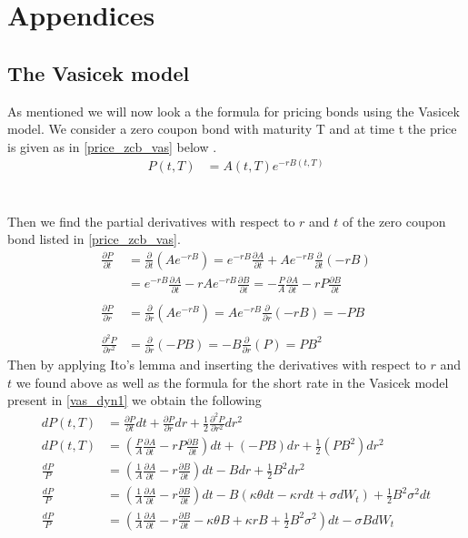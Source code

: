 \section{Appendices}
\subsection*{The Vasicek model}\label{appendices}
   
 As mentioned we will now look a the formula for pricing bonds using the Vasicek model. We consider a zero coupon bond
 with maturity T and at time t the price is given as in \autoref{price_zcb_vas} below \cite{Bjork}.
 \begin{align}
     P(t,T) &= A(t,T) e^{-rB(t,T)} 
     \label{price_zcb_vas} 
 \end{align}
 \\\\
 Then we find the partial derivatives with respect to $r$ and $t$ of the zero coupon bond listed in \autoref{price_zcb_vas}.
 \begin{align*}
     \frac{\partial P}{\partial t} &= \frac{\partial}{\partial t} (Ae^{-rB}) 
     = e^{-rB} \frac{\partial A}{\partial t} + Ae^{-rB} \frac{\partial}{\partial t} (-rB) \\
     &= e^{-rB} \frac{\partial A}{\partial t} - rAe^{-rB} \frac{\partial B}{\partial t} = 
     - \frac{P}{A} \frac{\partial A}{\partial t} - rP \frac{\partial B}{\partial t}
     \\\\
     \frac{\partial P}{\partial r} &= \frac{\partial}{\partial r} (Ae^{-rB}) 
     = Ae^{-rB} \frac{\partial}{\partial r} (-rB) = -PB 
     \\\\
     \frac{\partial^2 P}{\partial r^2} &= \frac{\partial}{\partial r} (-PB) = -B \frac{\partial}{\partial r} (P) = PB^2
 \end{align*}
 Then by applying Ito's lemma \cite{Bjork} and inserting the derivatives with respect to $r$ and $t$ we found above as well as
  the formula for the short rate in the Vasicek model present in \autoref{vas_dyn1} we obtain the following
 \begin{align*}
     dP(t,T) &= \frac{\partial P}{\partial t} dt + \frac{\partial P}{\partial r} dr 
     + \frac{1}{2} \frac{\partial^2 P}{\partial r^2} dr^2 \\
     dP(t,T) &= \left( \frac{P}{A} \frac{\partial A}{\partial t} - rP \frac{\partial B}{\partial t} \right) dt 
     + (-PB) dr + \frac{1}{2} (PB^2) dr^2 \\
     \frac{dP}{P} &= \left( \frac{1}{A} \frac{\partial A}{\partial t} - r \frac{\partial B}{\partial t} \right) dt 
     - B dr + \frac{1}{2} B^2 dr^2 \\
     \frac{dP}{P} &= \left( \frac{1}{A} \frac{\partial A}{\partial t} - r \frac{\partial B}{\partial t} \right) dt
      - B(\kappa \theta dt - \kappa r dt + \sigma dW_t) + \frac{1}{2} B^2 \sigma^2 dt\\
     \frac{dP}{P} &= \left( \frac{1}{A} \frac{\partial A}{\partial t} - r \frac{\partial B}{\partial t} 
     - \kappa \theta B + \kappa r B + \frac{1}{2} B^2 \sigma^2 \right) dt - \sigma B dW_t \\
 \end{align*}
